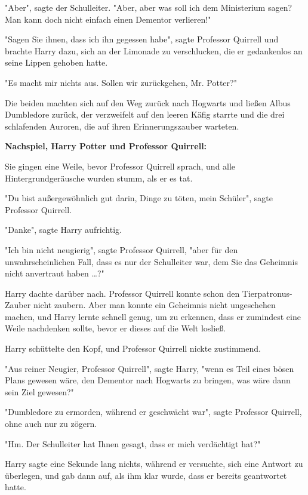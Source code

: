 {"Aber", sagte der Schulleiter. "Aber, aber was soll ich dem Ministerium sagen? Man kann doch nicht einfach einen Dementor verlieren!"

"Sagen Sie ihnen, dass ich ihn gegessen habe", sagte Professor Quirrell und brachte Harry dazu, sich an der Limonade zu verschlucken, die er gedankenlos an seine Lippen gehoben hatte.

"Es macht mir nichts aus. Sollen wir zurückgehen, Mr. Potter?"

Die beiden machten sich auf den Weg zurück nach Hogwarts und ließen Albus Dumbledore zurück, der verzweifelt auf den leeren Käfig starrte und die drei schlafenden Auroren, die auf ihren Erinnerungszauber warteten.

\textbf{Nachspiel, Harry Potter und Professor Quirrell:}

Sie gingen eine Weile, bevor Professor Quirrell sprach, und alle Hintergrundgeräusche wurden stumm, als er es tat.

"Du bist außergewöhnlich gut darin, Dinge zu töten, mein Schüler", sagte Professor Quirrell.

"Danke", sagte Harry aufrichtig.

"Ich bin nicht neugierig", sagte Professor Quirrell, "aber für den unwahrscheinlichen Fall, dass es nur der Schulleiter war, dem Sie das Geheimnis nicht anvertraut haben …?"

Harry dachte darüber nach. Professor Quirrell konnte schon den Tierpatronus-Zauber nicht zaubern. Aber man konnte ein Geheimnis nicht ungeschehen machen, und Harry lernte schnell genug, um zu erkennen, dass er zumindest eine Weile nachdenken sollte, bevor er dieses auf die Welt losließ.

Harry schüttelte den Kopf, und Professor Quirrell nickte zustimmend.

"Aus reiner Neugier, Professor Quirrell", sagte Harry, "wenn es Teil eines bösen Plans gewesen wäre, den Dementor nach Hogwarts zu bringen, was wäre dann sein Ziel gewesen?"

"Dumbledore zu ermorden, während er geschwächt war", sagte Professor Quirrell, ohne auch nur zu zögern.

"Hm. Der Schulleiter hat Ihnen gesagt, dass er mich verdächtigt hat?"

Harry sagte eine Sekunde lang nichts, während er versuchte, sich eine Antwort zu überlegen, und gab dann auf, als ihm klar wurde, dass er bereits geantwortet hatte.

}
